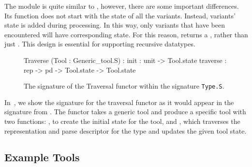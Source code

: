 The  module is quite similar to , however,
there are some important differences. Its  function does not
start with the state of all the variants. Instead, variants' state is
added during processing. In this way, only variants that have been
encountered will have corresponding state. For this reason,
 returns a , rather than just .
This design is essential for supporting recursive datatypes.

\begin{figure}
\begin{code}\scriptsize
   Traverse (Tool : Generic_tool.S) :
     init : unit -> Tool.state
     traverse : rep -> pd -> Tool.state -> Tool.state
\end{code}
\caption{The signature of the Traversal functor within the signature \texttt{Type.S}.}
\label{fig:traversal-interface}
\end{figure}

In~, we show the signature for the
traversal functor as it would appear in the signature  from
. The functor takes a generic tool and produce
a specific tool with two functions: , to create the initial
state for the tool, and , which traverses the
representation and parse descriptor for the type and updates the given
tool state.

\subsection{Example Tools}
\label{sec:gentool-motivation-ex}


